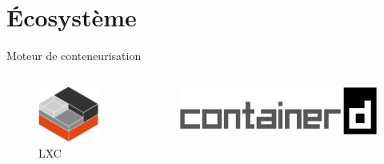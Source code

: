 \documentclass[11pt]{beamer}
\begin{document}
\section{Écosystème}
\begin{frame}{Moteur de conteneurisation}
\begin{columns}
	\begin{column}{0.48\textwidth}
		\begin{figure}
			\includegraphics[scale=0.15]{images/lxd.png}
			\caption{LXC}
		\end{figure}
	\end{column}
	\begin{column}{0.48\textwidth}
		\begin{figure}
			\includegraphics[scale=0.60]{images/containerd.png}
		\end{figure}
	\end{column}
\end{columns}

\end{frame}
\end{document}
